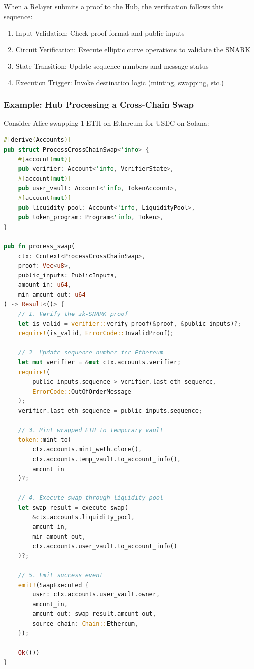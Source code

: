 \documentclass[11pt,a4paper]{article}
\begin{document}
When a Relayer submits a proof to the Hub, the verification follows this sequence:

\begin{enumerate}
    \item Input Validation: Check proof format and public inputs
    \item Circuit Verification: Execute elliptic curve operations to validate the SNARK
    \item State Transition: Update sequence numbers and message status
    \item Execution Trigger: Invoke destination logic (minting, swapping, etc.)
\end{enumerate}

\subsubsection*{Example: Hub Processing a Cross-Chain Swap}

Consider Alice swapping 1 ETH on Ethereum for USDC on Solana:

\begin{lstlisting}[language=Rust, caption={Solana Hub Verification and Execution}]
#[derive(Accounts)]
pub struct ProcessCrossChainSwap<'info> {
    #[account(mut)]
    pub verifier: Account<'info, VerifierState>,
    #[account(mut)]
    pub user_vault: Account<'info, TokenAccount>,
    #[account(mut)]
    pub liquidity_pool: Account<'info, LiquidityPool>,
    pub token_program: Program<'info, Token>,
}

pub fn process_swap(
    ctx: Context<ProcessCrossChainSwap>,
    proof: Vec<u8>,
    public_inputs: PublicInputs,
    amount_in: u64,
    min_amount_out: u64
) -> Result<()> {
    // 1. Verify the zk-SNARK proof
    let is_valid = verifier::verify_proof(&proof, &public_inputs)?;
    require!(is_valid, ErrorCode::InvalidProof);
    
    // 2. Update sequence number for Ethereum
    let mut verifier = &mut ctx.accounts.verifier;
    require!(
        public_inputs.sequence > verifier.last_eth_sequence,
        ErrorCode::OutOfOrderMessage
    );
    verifier.last_eth_sequence = public_inputs.sequence;
    
    // 3. Mint wrapped ETH to temporary vault
    token::mint_to(
        ctx.accounts.mint_weth.clone(),
        ctx.accounts.temp_vault.to_account_info(),
        amount_in
    )?;
    
    // 4. Execute swap through liquidity pool
    let swap_result = execute_swap(
        &ctx.accounts.liquidity_pool,
        amount_in,
        min_amount_out,
        ctx.accounts.user_vault.to_account_info()
    )?;
    
    // 5. Emit success event
    emit!(SwapExecuted {
        user: ctx.accounts.user_vault.owner,
        amount_in,
        amount_out: swap_result.amount_out,
        source_chain: Chain::Ethereum,
    });
    
    Ok(())
}
\end{lstlisting}
\end{document}
